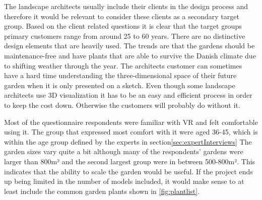 The landscape architects usually include their clients in the design process and therefore it would be relevant to consider these clients as a secondary target group. Based on the client related questions it is clear that the target groups primary customers range from around 25 to 60 years. There are no distinctive design elements that are heavily used. The trends are that the gardens should be maintenance-free and have plants that are able to survive the Danish climate due to shifting weather through the year. The architects customer can sometimes have a hard time understanding the three-dimensional space of their future garden when it is only presented on a sketch. Even though some landscape architects use 3D visualization it has to be an easy and efficient process in order to keep the cost down. Otherwise the customers will probably do without it.

Most of the questionnaire respondents were familiar with VR and felt comfortable using it. The group that expressed most comfort with it were aged 36-45, which is within the age group defined by the experts in section\autoref{sec:expertInterviews}
The garden sizes vary quite a bit although many of the respondents' gardens were larger than 800m² and the second largest group were in between 500-800m². This indicates that the ability to scale the garden would be useful. If the project ends up being limited in the number of models included, it would make sense to at least include the common garden plants shown in \autoref{fig:plantlist}.
